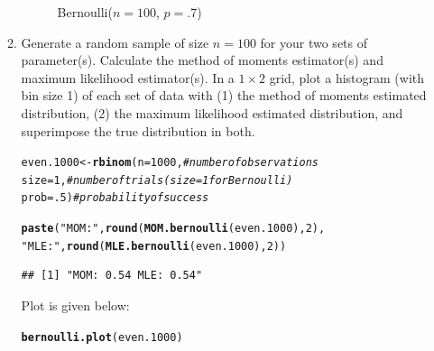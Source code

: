 \documentclass{article}\usepackage[]{graphicx}\usepackage[]{color}
\makeatletter
\newcommand{\hlnum}[1]{\textcolor[rgb]{0.686,0.059,0.569}{#1}}%
\newcommand{\hlstr}[1]{\textcolor[rgb]{0.192,0.494,0.8}{#1}}%
\newcommand{\hlcom}[1]{\textcolor[rgb]{0.678,0.584,0.686}{\textit{#1}}}%
\newcommand{\hlstd}[1]{\textcolor[rgb]{0.345,0.345,0.345}{#1}}%
\newcommand{\hlkwb}[1]{\textcolor[rgb]{0.69,0.353,0.396}{#1}}%
\newcommand{\hlkwc}[1]{\textcolor[rgb]{0.333,0.667,0.333}{#1}}%
\newcommand{\hlkwd}[1]{\textcolor[rgb]{0.737,0.353,0.396}{\textbf{#1}}}%
\newenvironment{kframe}{%
 \def\at@end@of@kframe{}%
 \ifinner\ifhmode%
  \def\at@end@of@kframe{\end{minipage}}%
  \begin{minipage}{\columnwidth}%
 \fi\fi%
 \def\FrameCommand##1{\hskip\@totalleftmargin \hskip-\fboxsep
 \colorbox{shadecolor}{##1}\hskip-\fboxsep
     \hskip-\linewidth \hskip-\@totalleftmargin \hskip\columnwidth}%
 \MakeFramed {\advance\hsize-\width
   \@totalleftmargin\z@ \linewidth\hsize
   \@setminipage}}%
 {\par\unskip\endMakeFramed%
 \at@end@of@kframe}
\newenvironment{knitrout}{}{} %
\makeatother
\begin{document}
\begin{enumerate}
\begin{enumerate}
\begin{figure}[H]
\begin{center}
\begin{knitrout}
\end{knitrout}
    \caption{Bernoulli($n=100$, $p=.7$)}
    \label{p4plot6}%
  \end{center}
\end{figure}
  \item Generate a random sample of size $n=100$ for your two sets of parameter(s).
  Calculate the method of moments estimator(s) and maximum likelihood estimator(s).
  In a $1 \times 2$ grid, plot a histogram (with bin size 1) of each set of data 
  with (1) the method of moments estimated distribution, (2) the maximum likelihood
  estimated distribution, and superimpose the true distribution in both.
\begin{knitrout}
\color{fgcolor}\begin{kframe}
\begin{alltt}
\hlstd{even.1000} \hlkwb{<-} \hlkwd{rbinom}\hlstd{(}\hlkwc{n}\hlstd{=}\hlnum{1000}\hlstd{,}        \hlcom{#number of observations}
                  \hlkwc{size}\hlstd{=}\hlnum{1}\hlstd{,}        \hlcom{#number of trials (size=1 for Bernoulli)}
                  \hlkwc{prob}\hlstd{=}\hlnum{.5}\hlstd{)}       \hlcom{#probability of success}

\hlkwd{paste}\hlstd{(}\hlstr{"MOM:"}\hlstd{,} \hlkwd{round}\hlstd{(}\hlkwd{MOM.bernoulli}\hlstd{(even.1000),}\hlnum{2}\hlstd{),}
      \hlstr{"MLE:"}\hlstd{,} \hlkwd{round}\hlstd{(}\hlkwd{MLE.bernoulli}\hlstd{(even.1000),} \hlnum{2}\hlstd{))}
\end{alltt}
\begin{verbatim}
## [1] "MOM: 0.54 MLE: 0.54"
\end{verbatim}
\end{kframe}
\end{knitrout}
Plot is given below:
\begin{knitrout}
\color{fgcolor}\begin{kframe}
\begin{alltt}
\hlkwd{bernoulli.plot}\hlstd{(even.1000)}
\end{alltt}
\end{kframe}
\end{knitrout}


\end{enumerate}
\end{enumerate}
\end{document}
